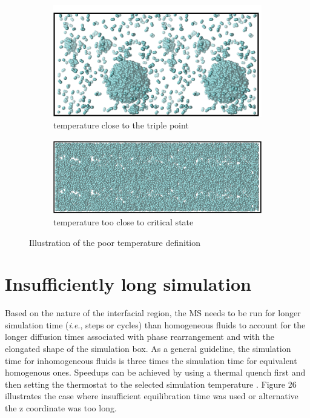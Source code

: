\documentclass{scrbook}
\begin{document}
\begin{figure}
	\centering
	\begin{subfigure}{0.8\textwidth} %
    \includegraphics[width=1\textwidth]{gfx/image75.png}
    \caption{temperature close to the triple point}
	\end{subfigure}
	\begin{subfigure}{0.8\textwidth} %
    \includegraphics[width=1\textwidth]{gfx/image76.png}
    \caption{temperature too close to critical state}
	\end{subfigure}
\caption{Illustration of the poor temperature definition}
\label{fig:25}
\end{figure}

\section{Insufficiently long simulation} 

Based on the nature of the interfacial region, the MS needs to be run for
longer simulation time (\textit{i.e}., steps or cycles) than homogeneous fluids
to account for the longer diffusion times associated with phase rearrangement
and with the elongated shape of the simulation box. As a general guideline, the
simulation time for inhomogeneous fluids is three times the simulation time for
equivalent homogenous ones. Speedups can be achieved by using a thermal quench
first and then setting the thermostat to the selected simulation temperature
\citep{gelb2002}. Figure 26 illustrates the case where insufficient equilibration time was
used or alternative the z coordinate was too long.
\end{document}
